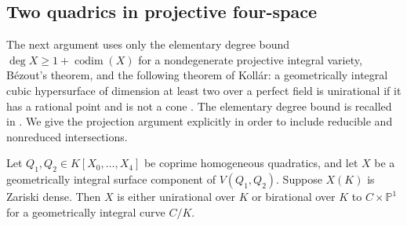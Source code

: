 \subsection{Two quadrics in projective four-space}

The next argument uses only the elementary degree bound
$\deg X\geq1+\operatorname{codim}(X)$ for a nondegenerate projective
integral variety, B\'ezout's theorem, and the following theorem of
Koll\'ar: a geometrically integral cubic hypersurface of dimension at
least two over a perfect field is unirational if it has a rational
point and is not a cone \cite[Theorem~2]{lbKollar2002}.
The elementary degree bound is recalled in
\cite[Introduction]{p2lbEGHP2006}.  We give the projection argument
explicitly in order to include reducible and nonreduced intersections.

\begin{proposition}\label{p2lb:two-quadrics-surface}
Let $Q_1,Q_2\in K[X_0,\ldots,X_4]$ be coprime homogeneous
quadratics, and let $X$ be a geometrically integral surface component
of $V(Q_1,Q_2)$.  Suppose $X(K)$ is Zariski dense.
Then $X$ is either unirational over $K$ or birational over $K$ to
$C\times\mathbb P^1$ for a geometrically integral curve $C/K$.
\end{proposition}
